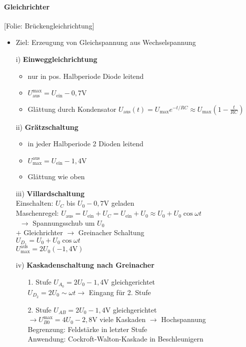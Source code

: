 \documentclass[titlepage,12pt,a4paper,ngerman]{report}
\newcommand{\tx}[1]{\textrm{#1}}
\newcommand{\folie}[1]{\color{gray}[Folie: #1]\color{black}}
\begin{document}
\paragraph{Gleichrichter}
\begin{trivlist}
	\item \folie{Brückengleichrichtung}
\end{trivlist}
\begin{itemize}
	\item Ziel: Erzeugung von Gleichspannung aus Wechselspannung
	\item[i)] \textbf{Einweggleichrichtung}
	\begin{itemize}
		\item nur in pos. Halbperiode Diode leitend
		\item $ U_{\tx{aus}}^{\tx{max}} = U_{\tx{ein}} - 0,7 \tx{V} $
		\item Glättung durch Kondensator $ U_{\tx{aus}}(t) = U_{\tx{max}} e^{-t/RC} \approx U_{\tx{max}} (1- \frac{t}{RC}) $
	\end{itemize}
	\item[ii)] \textbf{Grätzschaltung}
	\begin{itemize}
		\item in jeder Halbperiode 2 Dioden leitend
		\item $ U_{\tx{max}}^{\tx{aus}} = U_{\tx{ein}} - 1,4 \tx{V} $
		\item Glättung wie oben
	\end{itemize}
	\item [iii)] \textbf{Villardschaltung}\\
	Einschalten: $ U_C $ bis $ U_0 -0,7 \tx{V} $ geladen\\
	Maschenregel: $ U_{\tx{aus}} = U_{\tx{ein}} + U_C = U_{\tx{ein}} + U_0 \approx U_0 + U_0 \cos \omega t $\\\
	$ \rightarrow $ Spannungsschub um $ U_0 $\\
	$ + $ Gleichrichter $ \rightarrow $ Greinacher Schaltung\\
	$ U_{D_1} = U_0 + U_0 \cos \omega t $\\
	$ U_{\tx{max}}^{\tx{aus}} = 2 U_0 (-1,4 \tx{V}) $
	\item[iv)] \textbf{Kaskadenschaltung nach Greinacher}
	\begin{itemize}
		\item[1. Stufe]
		$ U_{A_0} = 2 U_0 -1,4\tx{V} $ gleichgerichtet\\
		$ U_{D_2} = 2 U_0 \sim \omega t \rightarrow $ Eingang für 2. Stufe
		\item [2. Stufe]
		$ U_{AB} = 2 U_0 - 1,4 \tx{V} $ gleichgerichtet\\
		$ \rightarrow U_{B0}^{\tx{max}} = 4 U_0 - 2,8 \tx{V} $
		viele Kaskaden $ \rightarrow $ Hochspannung\\
		Begrenzung: Feldstärke in letzter Stufe\\
		Anwendung: Cockroft-Walton-Kaskade in Beschleunigern
	\end{itemize}
\end{itemize}
\end{document}

